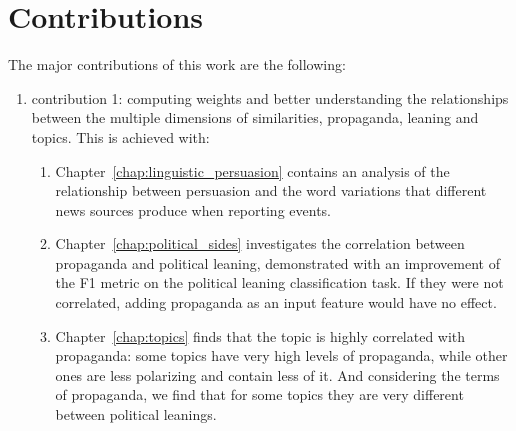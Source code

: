 \section{\statusgreen Contributions}
\label{sec:intro_contributions}

The major contributions of this work are the following:
\begin{enumerate}
    \item contribution 1: computing weights and better understanding the relationships between the multiple dimensions of similarities, propaganda, leaning and topics. This is achieved with:
    \begin{enumerate}
        \item Chapter~\ref{chap:linguistic_persuasion} contains an analysis of the relationship between persuasion and the word variations that different news sources produce when reporting events.
        \item Chapter~\ref{chap:political_sides} investigates the correlation between propaganda and political leaning, demonstrated with an improvement of the F1 metric on the political leaning classification task. If they were not correlated, adding propaganda as an input feature would have no effect.
        \item Chapter~\ref{chap:topics} finds that the topic is highly correlated with propaganda: some topics have very high levels of propaganda, while other ones are less polarizing and contain less of it. And considering the terms of propaganda, we find that for some topics they are very different between political leanings. %
        

\end{enumerate}
\end{enumerate}

